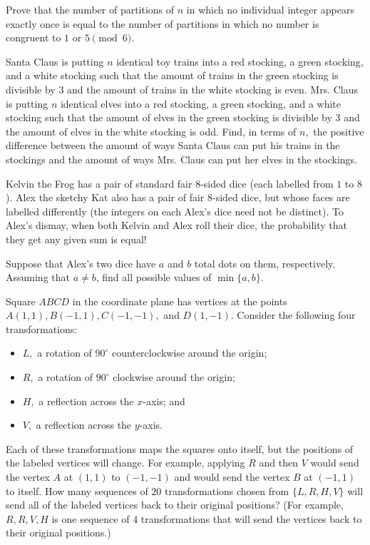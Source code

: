 \documentclass{article}
\begin{document}
\begin{req}[]{6}
Prove that the number of partitions of $n$ in which no individual integer appears exactly once is equal to the number of partitions in which no number is congruent to $1$ or $5\pmod{6}.$
\end{req}


\begin{prob}[ART 2020/4]{6}
Santa Claus is putting $n$ identical toy trains into a red stocking, a green stocking, and a white stocking such that the amount of trains in the green stocking is divisible by $3$ and the amount of trains in the white stocking is even. Mrs. Claus is putting $n$ identical elves into a red stocking, a green stocking, and a white stocking such that the amount of elves in the green stocking is divisible by $3$ and the amount of elves in the white stocking is odd. Find, in terms of $n,$ the positive difference between the amount of ways Santa Claus can put his trains in the stockings and the amount of ways Mrs. Claus can put her elves in the stockings.
\end{prob}

\begin{prob}[HMMT 2016]{9}
Kelvin the Frog has a pair of standard fair $8$-sided dice (each labelled from $1$ to $8$). Alex the sketchy Kat also has a pair of fair $8$-sided dice, but whose faces are labelled differently (the integers on each Alex's dice need not be distinct). To Alex's dismay, when both Kelvin and Alex roll their dice, the probability that they get any given sum is equal!

Suppose that Alex's two dice have $a$ and $b$ total dots on them, respectively. Assuming that $a \neq b$, find all possible values of $\min \{a,b\}$.
\end{prob}

\begin{req}[AMC 12B 2020/19]{9}
Square $ABCD$ in the coordinate plane has vertices at the points $A(1,1), B(-1,1), C(-1,-1),$ and $D(1,-1).$ Consider the following four transformations: 

\begin{itemize}
\item $L,$ a rotation of $90^{\circ}$ counterclockwise around the origin;
\item $R,$ a rotation of $90^{\circ}$ clockwise around the origin;
\item $H,$ a reflection across the $x$-axis; and
\item $V,$ a reflection across the $y$-axis.
\end{itemize}

Each of these transformations maps the squares onto itself, but the positions of the labeled vertices will change. For example, applying $R$ and then $V$ would send the vertex $A$ at $(1,1)$ to $(-1,-1)$ and would send the vertex $B$ at $(-1,1)$ to itself. How many sequences of $20$ transformations chosen from $\{L, R, H, V\}$ will send all of the labeled vertices back to their original positions? (For example, $R, R, V, H$ is one sequence of $4$ transformations that will send the vertices back to their original positions.)
\end{req}
\end{document}
